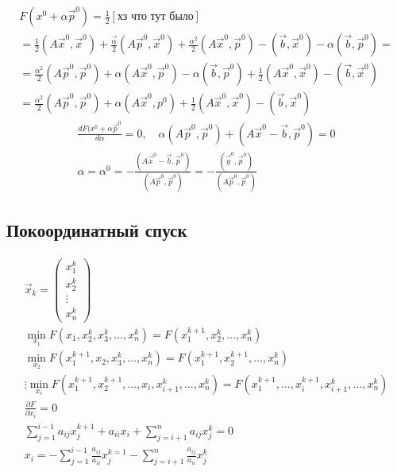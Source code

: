 \begin{gather*}
F(x^0 + \alpha \vec p^0) = \frac12 \left[ \text{хз что тут было}\right] \\
  = \frac12 (A\vec x^0, \vec x^0) + \frac{\vec\alpha}{2} (A \vec p^0, \vec x^0) +
  \frac{\alpha^2}2(A\vec x^0, \vec p^0) - (\vec b, \vec x^0) - \alpha(\vec b, \vec p^0) = \\
  = \frac{\alpha^2}{2} (A \vec p^0, \vec p^0) + \alpha (A \vec x^0, \vec p^0) -
  \alpha(\vec b, \vec p^0) + \frac12 (A\vec x^0, \vec x^0) - (\vec b, \vec x^0) \\
  = \frac{\alpha^2}{2} (A \vec p^0, \vec p^0) + \alpha (A \vec x^0, p^0) + \frac12(A\vec x^0, \vec x^0) - (\vec b, \vec x^0)
\end{gather*}
\begin{align*}
  \frac{dF(x^0 + \alpha {\vec p}^0}{d\alpha} = 0, \quad \alpha(A\vec p^0, \vec p^0) + (A \vec x^0 - \vec b, \vec p^0) = 0 \\
                      \alpha = \alpha^0 = -\frac{(A \vec x^0 - \vec b, \vec p^0)}{(A\vec p^0, \vec p^0)} = -\frac{(\vec g^0, \vec p^0)}{(A\vec p^0, \vec p^0)}
\end{align*}


\subsection{Покоординатный спуск}
\begin{gather*}
  \vec{x}_k =
  \begin{pmatrix}
    x_1^k\\
    x_2^k\\
    \vdots\\
    x_n^k
  \end{pmatrix} \\
  \min_{x_1} F(x_1, x_2^k, x_3^k, \dotsc, x_n^k) = F(x_1^{k + 1}, x_2^k,
  \dotsc, x_n^k) \\
  \min_{x_2} F(x_1^{k + 1}, x_2, x_3^k, \dotsc, x_n^k) = F(x_1^{k + 1}, x_2^{k +
    1}, \dotsc, x_n^k)\\
  \vdots
  \min_{x_i} F(x_1^{k + 1}, x_2^{k + 1}, \dotsc, x_i, x_{i + 1}^k, \dotsc,
  x_n^k) = F(x_1^{k + 1}, \dotsc, x_i^{k + 1}, x_{i + 1}^k, \dotsc, x_n^k) \\
  \frac{\partial F}{\partial x_i}= 0\\
  \sum_{j = 1}^{i - 1} a_{ij}x_j^{k + 1} + a_{ii}x_i + \sum_{j = i + 1}^n
  a_{ij}x_j^k = 0 \\
  x_i = - \sum_{j = 1}^{i - 1} \frac{a_{ij}}{a_{ii}} x_j^{k = 1} - \sum_{j = i +
  1}^n \frac{a_{ij}}{a_{ii}}x_j^k 
\end{gather*}

